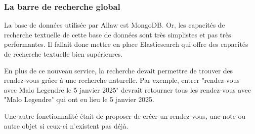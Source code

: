 \subsubsection{La barre de recherche global}

La base de données utilisée par Allaw est MongoDB. Or, les capacités de
recherche textuelle de cette base de données sont très simplistes et pas très
performantes. Il fallait donc mettre en place Elasticsearch qui offre des
capacités de recherche textuelle bien supérieures.

En plus de ce nouveau service, la recherche devait permettre de trouver des
rendez-vous grâce à une recherche naturelle. Par exemple, entrer "rendez-vous
avec Malo Legendre le 5 janvier 2025" devrait retourner tous les rendez-vous
avec "Malo Legendre" qui ont eu lieu le 5 janvier 2025.

Une autre fonctionnalité était de proposer de créer un rendez-vous, une note ou
autre objet si ceux-ci n'existent pas déjà.
